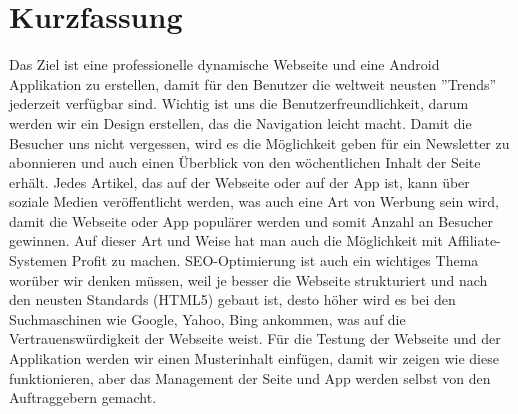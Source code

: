 %
%
\newpage

%
%
\section*{Kurzfassung}
Das Ziel ist eine professionelle dynamische Webseite und eine Android Applikation zu
erstellen, damit für den Benutzer die weltweit neusten ''Trends'' jederzeit verfügbar sind.
Wichtig ist uns die Benutzerfreundlichkeit, darum werden wir ein Design erstellen, das die
Navigation leicht macht. Damit die Besucher uns nicht vergessen, wird es die Möglichkeit
geben für ein Newsletter zu abonnieren und auch einen Überblick von den wöchentlichen
Inhalt der Seite erhält.
Jedes Artikel, das auf der Webseite oder auf der App ist, kann über soziale Medien
veröffentlicht werden, was auch eine Art von Werbung sein wird, damit die Webseite oder
App populärer werden und somit Anzahl an Besucher gewinnen. Auf dieser Art und Weise
hat man auch die Möglichkeit mit Affiliate-Systemen Profit zu machen.
SEO-Optimierung ist auch ein wichtiges Thema worüber wir denken müssen, weil je besser
die Webseite strukturiert und nach den neusten Standards (HTML5) gebaut ist, desto höher
wird es bei den Suchmaschinen wie Google, Yahoo, Bing ankommen, was auf die
Vertrauenswürdigkeit der Webseite weist.
Für die Testung der Webseite und der Applikation werden wir einen Musterinhalt einfügen,
damit wir zeigen wie diese funktionieren, aber das Management der Seite und App werden
selbst von den Auftraggebern gemacht.



\color{black} 
